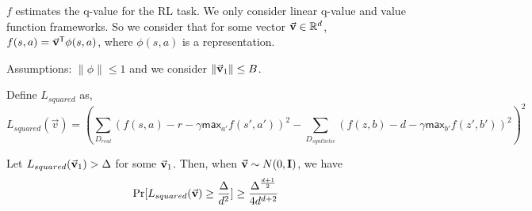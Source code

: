 $f$ estimates the q-value for the RL task. We only consider linear q-value and value function frameworks. So we consider that for some vector $\vec{{\mathbf{v}}} \in \mathbb{R}^d$, $f(s,a) = {\vec{{\mathbf{v}}}}^{\sf T}\phi(s,a)$, where $\phi(s,a)$ is a representation.

Assumptions: $\|\phi\| \leq 1$ and we consider $\|\vec{{\mathbf{v}}}_1\|\leq B$.

Define $L_{squared}$ as,
\[
    L_{squared}(\vec{v}) = \left(\sum_{D_{real}}(f(s,a) - r -\gamma \mathsf{max}_{a'}f(s',a'))^2 - \sum_{D_{synthetic}}(f(z,b) - d -\gamma \mathsf{max}_{b'}f(z',b'))^2 \right)^2
\]
\begin{theorem}
    Let $L_{squared}(\vec{{\mathbf{v}}}_1) > \Delta$ for some $\vec{{\mathbf{v}}}_1$.
    Then, when $\vec{{\mathbf{v}}} \sim N(0,{\mathbf{I}})$, we have
    \[
    \Pr[L_{squared}(\vec{{\mathbf{v}}}) \geq \frac{\Delta}{d^2}] \geq  \frac{\Delta^{\frac{d+1}{2}}}{4d^{d+2}}
    \]
\end{theorem}

